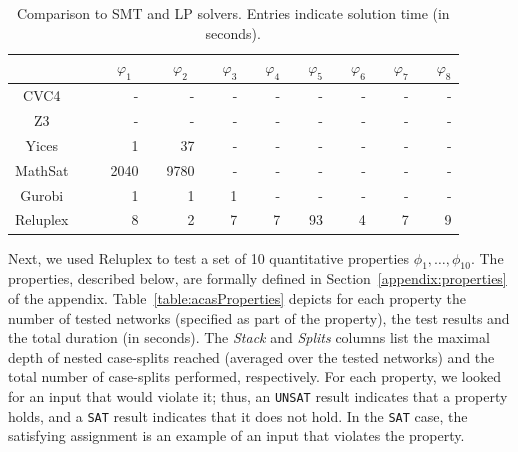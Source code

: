 \documentclass[a4paper]{llncs}
\newcommand{\sat}{\texttt{SAT}}
\newcommand{\unsat}{\texttt{UNSAT}}
\begin{document}
\begin{table}
\centering
\caption{
Comparison to SMT and LP solvers. Entries indicate solution time (in seconds).
}
\begin{tabular}[htp]{cc|crlrlrlrlrlrlrlr}
  \toprule
  &&& \multicolumn{1}{c}{$\varphi_1$} %
  && \multicolumn{1}{c}{$\varphi_2$}   %
  && \multicolumn{1}{c}{$\varphi_3$}   %
  && \multicolumn{1}{c}{$\varphi_4$}   %
  && \multicolumn{1}{c}{$\varphi_5$}   %
  && \multicolumn{1}{c}{$\varphi_6$}   %
  && \multicolumn{1}{c}{$\varphi_7$}   %
  && \multicolumn{1}{c}{$\varphi_8$}   %
    \\
  \midrule
  CVC4     &&& -    && -    && - && - && -  && - && - && - \\
  Z3       &&& -    && -    && - && - && -  && - && - && - \\
  Yices    &&& 1    && 37   && - && - && -  && - && - && - \\
  MathSat  &&& 2040 && 9780 && - && - && -  && - && - && - \\
  Gurobi   &&& 1    && 1    && 1 && - && -  && - && - && - \\
  Reluplex &&& 8    && 2    && 7 && 7 && 93 && 4 && 7 && 9 \\
  \bottomrule
\end{tabular}%
\label{table:smtSolvers}
\end{table}%

Next, we used Reluplex to test a set of 10 quantitative properties
$\phi_1,\ldots,\phi_{10}$. The properties, described
 below, are formally defined in 
Section~\ref*{appendix:properties} of the
appendix.
Table~\ref{table:acasProperties} depicts for each property the number
of tested networks (specified as part of the property), the test
results and the total duration
(in seconds). The \emph{Stack} and \emph{Splits} columns list the maximal depth of
nested case-splits reached (averaged over the tested networks)
and the total number of case-splits performed, respectively.
For each property, we looked for an input that would violate it;
thus, an \unsat{} result indicates that a property
holds, and a \sat{} result indicates that it does not hold.
In the \sat{} case, the 
satisfying assignment is an example of an input that violates the property.
\end{document}
